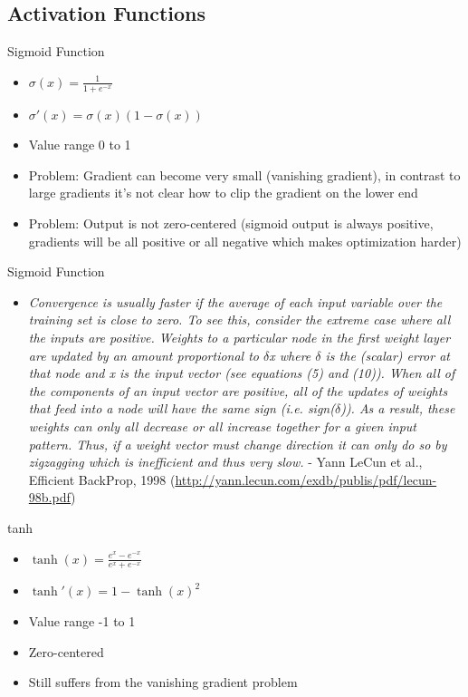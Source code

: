 \subsection{Activation Functions}
\begin{frame}{Sigmoid Function}{}
	\begin{itemize}
		\item $\sigma(x) = \frac{1}{1 + e^{-x}}$
		\item $\sigma'(x) = \sigma(x) (1 - \sigma(x))$
		\item Value range 0 to 1
		\item Problem: Gradient can become very small (vanishing gradient), in contrast to large gradients it's not clear how to clip the gradient on the lower end
		\item Problem: Output is not zero-centered (sigmoid output is always positive, gradients will be all positive or all negative which makes optimization harder)
	\end{itemize}
\end{frame}

\begin{frame}{Sigmoid Function}{}
	\begin{itemize}
		\item \textit{Convergence is usually faster if the average of each input variable over the training set is close to zero. To see this, consider the extreme case where all the inputs are positive. Weights to a particular node in the first weight layer are updated by an amount proportional to $\delta$x where $\delta$ is the (scalar) error at that node and x is the input vector (see equations (5) and (10)). When all of the components of an input vector are positive, all of the updates of weights that feed into a node will have the same sign (i.e. sign($\delta$)). As a result, these weights can only all decrease or all increase together for a given input pattern. Thus, if a weight vector must change direction it can only do so by zigzagging which is inefficient and thus very slow.} - Yann LeCun et al., Efficient BackProp, 1998 (\url{http://yann.lecun.com/exdb/publis/pdf/lecun-98b.pdf})
	\end{itemize}
\end{frame}

\begin{frame}{tanh}{}
	\begin{itemize}
		\item $\tanh(x) = \frac{e^x - e^{-x}}{e^x + e^{-x}}$
		\item $\tanh'(x) = 1 - \tanh(x)^2$
		\item Value range -1 to 1
		\item Zero-centered
		\item Still suffers from the vanishing gradient problem
	\end{itemize}
\end{frame}

